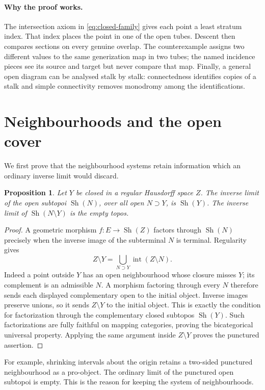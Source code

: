 \documentclass[11pt,a4paper]{article}
\newtheorem{proposition}[theorem]{Proposition}
\theoremstyle{definition}
\newcommand{\Sh}{\operatorname{Sh}}
\begin{document}
\paragraph{Why the proof works.}
The intersection axiom in \eqref{eq:closed-family} gives each point a least stratum index. That index places the point in one of the open tubes. Descent then compares sections on every genuine overlap. The counterexample assigns two different values to the same generization map in two tubes; the named incidence pieces see its source and target but never compare that map. Finally, a general open diagram can be analysed stalk by stalk: connectedness identifies copies of a stalk and simple connectivity removes monodromy among the identifications.

\section{Neighbourhoods and the open cover}
We first prove that the neighbourhood systems retain information which an ordinary inverse limit would discard.

\enlargethispage{\baselineskip}
\begin{proposition}\label{prop:collapse}
Let $Y$ be closed in a regular Hausdorff space $Z$. The inverse limit of the open subtopoi $\Sh(N)$, over all open $N\supset Y$, is $\Sh(Y)$. The inverse limit of $\Sh(N\setminus Y)$ is the empty topos.
\end{proposition}
\begin{proof}
A geometric morphism $f:E\to\Sh(Z)$ factors through $\Sh(N)$ precisely when the inverse image of the subterminal $N$ is terminal. Regularity gives
\[
 Z\setminus Y=\bigcup_{N\supset Y}\operatorname{int}(Z\setminus N).
\]
Indeed a point outside $Y$ has an open neighbourhood whose closure misses $Y$; its complement is an admissible $N$. A morphism factoring through every $N$ therefore sends each displayed complementary open to the initial object. Inverse images preserve unions, so it sends $Z\setminus Y$ to the initial object. This is exactly the condition for factorization through the complementary closed subtopos $\Sh(Y)$. Such factorizations are fully faithful on mapping categories, proving the bicategorical universal property. Applying the same argument inside $Z\setminus Y$ proves the punctured assertion.
\end{proof}
For example, shrinking intervals about the origin retains a two-sided punctured neighbourhood as a pro-object. The ordinary limit of the punctured open subtopoi is empty. This is the reason for keeping the system of neighbourhoods.
\end{document}
